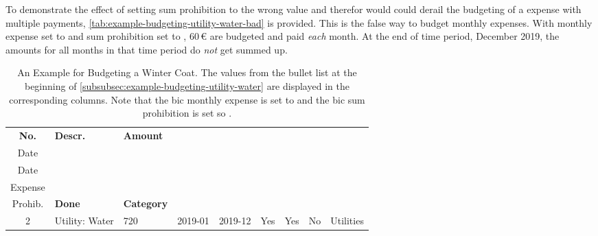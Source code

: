 To demonstrate the effect of setting sum prohibition to the wrong value and therefor would could derail the budgeting of a expense with multiple payments, \autoref{tab:example-budgeting-utility-water-bad} is provided.
This is the false way to budget monthly expenses.
With monthly expense set to  and sum prohibition set to , 60\,€ are budgeted and paid \emph{each} month.
At the end of time period, \ie December 2019, the amounts for all months in that time period do \emph{not} get summed up.

\begin{table}[hbtp]
	\centering
	\addtolength{\leftskip}{-1.0cm}
	\sffamily
	\caption[An Example for Budgeting a Winter Coat: Data Entry]{An Example for Budgeting a Winter Coat.
	The values from the bullet list at the beginning of  \autoref{subsubsec:example-budgeting-utility-water} are displayed in the corresponding columns.
	Note that the \ac{bic} monthly expense is set to  and the \ac{bic} sum prohibition is set so .}
	\label{tab:example-budgeting-water-dataentry}
	\begin{tabular}{|c|l|l|l|l|c|c|c|l|}
		\hline
		\begin{minipage}{0.5cm}\footnotesize\bfseries
			No.
		\end{minipage} &
		\begin{minipage}{1.5cm}\footnotesize\bfseries
			Descr.
		\end{minipage} &
		\begin{minipage}[b]{1.0cm}	\footnotesize\bfseries	Amount
		\end{minipage} &
		\begin{minipage}[b][0.8cm]{0.8cm}\footnotesize\bfseries
			Start\\
			Date
		\end{minipage} &
		\begin{minipage}[b]{0.8cm}\footnotesize\bfseries
			End\\
			Date
		\end{minipage} &
		\begin{minipage}[b]{1.1cm}\footnotesize\bfseries
			Monthly\\
			Expense
		\end{minipage} &
		\begin{minipage}[b]{1.0cm}\footnotesize\bfseries
			Sum\\
			Prohib.
		\end{minipage} &
		\begin{minipage}[b]{0.8cm}\footnotesize\bfseries
			Done
		\end{minipage} &
		\begin{minipage}[b]{1.5cm}\footnotesize\bfseries
			Category
		\end{minipage}\\ 
		\hline
		\hline
		2 & Utility: Water & 720 & 2019-01 & 2019-12 & Yes & Yes & No & Utilities\\
		\hline
	\end{tabular}
\end{table}

